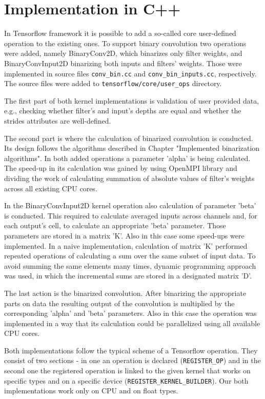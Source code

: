 \documentclass[licencjacka]{pracamgr}
\begin{document}
		\section{Implementation in C++}
		In Tensorflow framework it is possible to add a so-called core user-defined operation to the existing ones. To support binary convolution two operations were added, namely BinaryConv2D, which binarizes only filter weights, and BinaryConvInput2D binarizing both inputs and filters' weights. Those were implemented in source files \texttt{conv\_bin.cc} and \texttt{conv\_bin\_inputs.cc}, respectively. The source files were added to \texttt{tensorflow/core/user\_ops} directory.
		
		The first part of both kernel implementations is validation of user provided data, e.g., checking whether filter's and input's depths are equal and whether the strides attributes are well-defined.
		
		The second part is where the calculation of binarized convolution is conducted. Its design follows the algorithms described in Chapter "Implemented binarization algorithms". In both added operations a parameter 'alpha' is being calculated. The speed-up in its calculation was gained by using OpenMPI library and dividing the work of calculating summation of absolute values of filter's weights across all existing CPU cores.

		In the BinaryConvInput2D kernel operation also calculation of parameter 'beta' is conducted. This required to calculate averaged inputs across channels and, for each output's cell, to calculate an appropriate 'beta' parameter. Those parameters are stored in a matrix 'K'. Also in this case some speed-ups were implemented. In a naive implementation, calculation of matrix 'K' performed repeated operations of calculating a sum over the same subset of input data. To avoid summing the same elements many times, dynamic programming approach was used, in which the incremental sums are stored in a designated matrix 'D'.
	
		The last action is the binarized convolution. After binarizing the appropriate parts on data the resulting output of the convolution is multiplied by the corresponding 'alpha' and 'beta' parameters. Also in this case the operation was implemented in a way that its calculation could be parallelized using all available CPU cores.

		Both implementations follow the typical scheme of a Tensorflow operation. They consist of two sections - in one an operation is declared (\texttt{REGISTER\_OP}) and in the second one the registered operation is linked to the given kernel that works on specific types and on a specific device (\texttt{REGISTER\_KERNEL\_BUILDER}). Our both implementations work only on CPU and on float types. 
\end{document}
